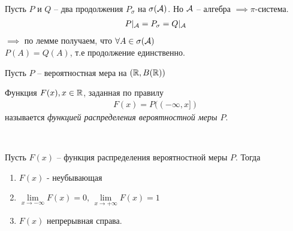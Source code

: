 \begin{corollary}~

	Пусть $P$ и $Q$ -- два продолжения $P_\sigma$ на $\sigma(\mathcal{A})$. 
	Но $\mathcal{A}$ -- алгебра $\implies \pi$-система.
	\begin{align*}
		P |_{\mathcal{A}} = P_\sigma = Q |_{\mathcal{A}}
	\end{align*}
	$\implies$ по лемме получаем, что $\forall A \in \sigma(\mathcal{A})$\\
	$P(A) = Q(A)$, т.е продолжение единственно.\\
\end{corollary}

Пусть $P$ -- вероятностная мера на $(\mathbb{R}, B(\mathbb{R}))$

\begin{definition}
	Функция $F(x), x \in \mathbb{R}$, заданная по правилу
	\begin{align*}
		F(x) = P((-\infty, x])
	\end{align*}
	называется \emph{функцией распределения вероятностной меры $P$}.
\end{definition}

\begin{lemma}~

	Пусть $F(x)$ -- функция распределения вероятностной меры $P$. Тогда
	\begin{enumerate}
		\item 
			$F(x)$ - неубывающая

		\item 
			$\lim\limits_{x \rightarrow -\infty} F(x) = 0, \, 
			\lim\limits_{x \rightarrow +\infty} F(x) = 1$

		\item 
			$F(x)$ непрерывная справа.
	\end{enumerate}
\end{lemma}

